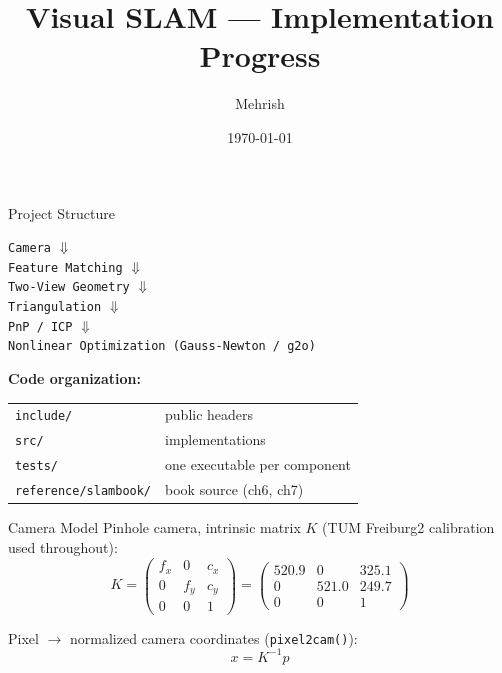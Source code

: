 \documentclass[aspectratio=169]{beamer}
\title{Visual SLAM --- Implementation Progress}
\author{Mehrish}
\date{\today}
\begin{document}
\begin{frame}
  \titlepage
\end{frame}

\begin{frame}{Project Structure}
  \begin{center}
    \texttt{Camera} $\Downarrow$\\
    \texttt{Feature Matching} $\Downarrow$\\
    \texttt{Two-View Geometry} $\Downarrow$\\
    \texttt{Triangulation} $\Downarrow$\\
    \texttt{PnP / ICP} $\Downarrow$\\
    \texttt{Nonlinear Optimization (Gauss-Newton / g2o)}
  \end{center}

  \vspace{1em}
  \textbf{Code organization:}
  \begin{center}
    \begin{tabular}{ll}
      \texttt{include/} & public headers \\
      \texttt{src/}     & implementations \\
      \texttt{tests/}   & one executable per component \\
      \texttt{reference/slambook/} & book source (ch6, ch7) \\
    \end{tabular}
  \end{center}
\end{frame}

\begin{frame}{Camera Model}
  Pinhole camera, intrinsic matrix $K$ (TUM Freiburg2 calibration used throughout):
  \[
    K =
    \begin{pmatrix}
      f_x & 0 & c_x \\
      0 & f_y & c_y \\
      0 & 0 & 1
    \end{pmatrix}
    =
    \begin{pmatrix}
      520.9 & 0 & 325.1 \\
      0 & 521.0 & 249.7 \\
      0 & 0 & 1
    \end{pmatrix}
  \]

  Pixel $\to$ normalized camera coordinates (\texttt{pixel2cam()}):
  \[
    x = K^{-1} p
  \]
\end{frame}
\end{document}
